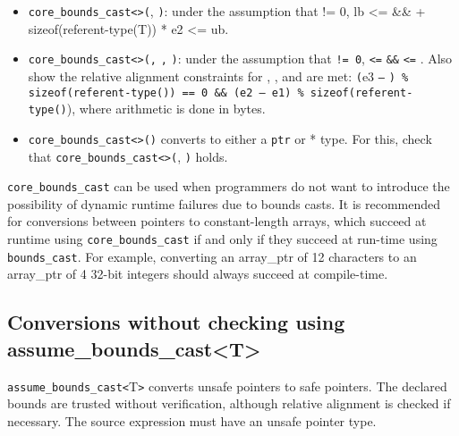 \begin{itemize}
\item
  \texttt{core\_bounds\_cast\textless{}}\texttt{\textgreater{}(},
  \texttt{)}: under the assumption that  != 0, lb
  \textless{}=  \&\&  + sizeof(referent-type(T)) * e2
  \textless{}= ub.
\item
  \texttt{core\_bounds\_cast\textless{}}\texttt{\textgreater{}(}\texttt{,}
  \texttt{,} \texttt{)}: under the assumption that
   \texttt{!= 0},  \texttt{\textless{}=} 
  \texttt{\&\&}  \texttt{\textless{}=} . Also show the
  relative alignment constraints for , , and 
  are met: \texttt{(}e3 \texttt{--} \texttt{) \%
  sizeof(referent-type(}\texttt{)) == 0 \&\& (e2 -- e1) \%
  sizeof(referent-type(}\texttt{)}), where arithmetic is done in
  bytes.
\item
  \texttt{core\_bounds\_cast\textless{}}\texttt{\textgreater{}(}\texttt{)}
  converts  to either a \texttt{ptr} or * type. For this, check
  that
  \texttt{core\_bounds\_cast\textless{}}\texttt{\textgreater{}(},
  \texttt{)} holds.
\end{itemize}

\texttt{core\_bounds\_cast} can be used when programmers do not want to
introduce the possibility of dynamic runtime failures due to bounds
casts. It is recommended for conversions between pointers to
constant-length arrays, which succeed at runtime using
\texttt{core\_bounds\_cast} if and only if they succeed at run-time
using \texttt{bounds\_cast}. For example, converting an array\_ptr of 12
characters to an array\_ptr of 4 32-bit integers should always succeed
at compile-time.

\subsection{Conversions without checking using assume\_bounds\_cast\textless{}T\textgreater{}}

\texttt{assume\_bounds\_cast\textless{}}T\texttt{\textgreater{}}
converts unsafe pointers to safe pointers. The declared bounds are
trusted without verification, although relative alignment is checked if
necessary. The source expression must have an unsafe pointer type.

